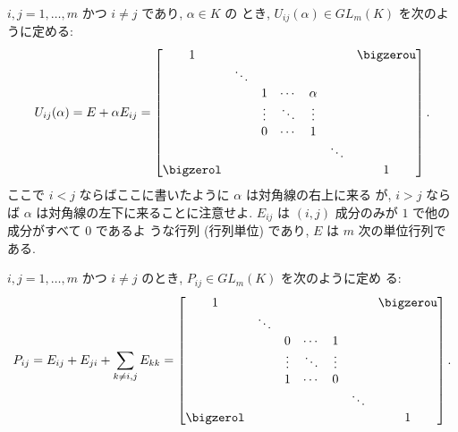 \documentclass[12pt,twoside]{jarticle}
\begin{document}

$i,j=1,\ldots,m$ かつ $i\ne j$ であり, $\alpha\in K$ の
とき, $U_{ij}(\alpha)\in GL_m(K)$ を次のように定める:
\begin{equation*}
  U_{ij}(\alpha) = E + \alpha E_{ij} =
  \begin{bmatrix}
    1 &        &        &        &        & & \bigzerou \\
      & \ddots &        &        &        & & \\
      &        & 1      & \cdots & \alpha & & \\
      &        & \vdots & \ddots & \vdots & & \\
      &        & 0      & \cdots & 1      & & \\
      &        &        &        &        & \ddots & \\
    \bigzerol & &       &        &        &        & 1 \\
  \end{bmatrix}.
\end{equation*}
ここで $i<j$ ならばここに書いたように $\alpha$ は対角線の右上に来る
が, $i>j$ ならば $\alpha$ は対角線の左下に来ることに注意せよ.
$E_{ij}$ は $(i,j)$ 成分のみが $1$ で他の成分がすべて $0$ であるよ
うな行列 (行列単位) であり, $E$ は $m$ 次の単位行列である.

$i,j=1,\ldots,m$ かつ $i\ne j$ のとき, $P_{ij}\in GL_m(K)$ を次のように定め
る:
\begin{equation*}
  P_{ij} = E_{ij} + E_{ji} + \sum_{k\ne i,j} E_{kk} =
  \begin{bmatrix}
    1 &        &        &        &        & & \bigzerou \\
      & \ddots &        &        &        & & \\
      &        & 0      & \cdots & 1      & & \\
      &        & \vdots & \ddots & \vdots & & \\
      &        & 1      & \cdots & 0      & & \\
      &        &        &        &        & \ddots & \\
    \bigzerol & &       &        &        &        & 1 \\
  \end{bmatrix}.
\end{equation*}
\end{document}
